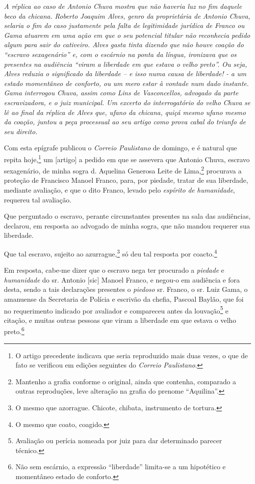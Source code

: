 {\begin{flushright}
\begin{didascalia}
\emph{A réplica ao caso de Antonio Chuva mostra que não haveria luz no
fim daquele beco da chicana. Roberto Joaquim Alves, genro da
proprietária de Antonio Chuva, selaria o fim do caso justamente pela
falta de legitimidade jurídica de Franco ou Gama atuarem em uma ação em
que o seu potencial titular não reconhecia pedido algum para sair do
cativeiro. Alves gasta tinta dizendo que não houve coação do ``escravo
sexagenário'' e, com o escárnio na ponta da língua, ironizava que os
presentes na audiência ``viram a liberdade em que estava o velho preto''.
Ou seja, Alves reduzia o significado da liberdade -- e isso numa causa
de liberdade! - a um estado momentâneo de conforto, ou um mero estar à
vontade num dado instante. Gama interrogou Chuva, assim como Lins de
Vasconcellos, advogado da parte escravizadora, e o juiz municipal. Um
excerto do interrogatório do velho Chuva se lê ao final da réplica de
Alves que, ufano da chicana, quiçá mesmo ufano mesmo da coação, juntou a
peça processual ao seu artigo como prova cabal do triunfo de seu
direito.}
\end{didascalia}


Com esta epígrafe publicou o \emph{Correio Paulistano} de domingo, e é
natural que repita hoje,\footnote{ O artigo precedente indicava que
  seria reproduzido mais duas vezes, o que de fato se verificou em
  edições seguintes do \emph{Correio Paulistano}.} um {[}artigo{]} a
pedido em que se assevera que Antonio Chuva, escravo sexagenário, de
minha sogra d. Aquelina Generosa Leite de Lima,\footnote{ Mantenho a
  grafia conforme o original, ainda que contenha, comparado a outras
  reproduções, leve alteração na grafia do prenome ``Aquilina''.} procurava
a proteção de Francisco Manoel Franco, para, por piedade, tratar de sua
liberdade, mediante avaliação, e que o dito Franco, levado pelo
\emph{espírito de humanidade}, requereu tal avaliação.

Que perguntado o escravo, perante circunstantes presentes na sala das
audiências, declarou, em resposta ao advogado de minha sogra, que não
mandou requerer sua liberdade.

Que tal escravo, sujeito ao azurrague,\footnote{ O mesmo que azorrague.
  Chicote, chibata, instrumento de tortura.} só deu tal resposta por
coacto.\footnote{ O mesmo que coato, coagido.}

Em resposta, cabe-me dizer que o escravo nega ter procurado a
\emph{piedade} e \emph{humanidade} do sr. Antonio {[}sic{]} Manoel
Franco, e negou-o em audiência e fora desta, sendo a tais declarações
presentes o \emph{piedoso} sr. Franco, o sr. Luiz Gama, o amanuense da
Secretaria de Polícia e escrivão da chefia, Pascoal Baylão, que foi no
requerimento indicado por avaliador e compareceu antes da
louvação\footnote{ Avaliação ou perícia nomeada por juiz para dar
  determinado parecer técnico.} e citação, e muitas outras pessoas que
viram a liberdade em que estava o velho preto.\footnote{Não sem
  escárnio, a expressão ``liberdade'' limita-se a um hipotético e
  momentâneo estado de conforto.}


\end{flushright}}
